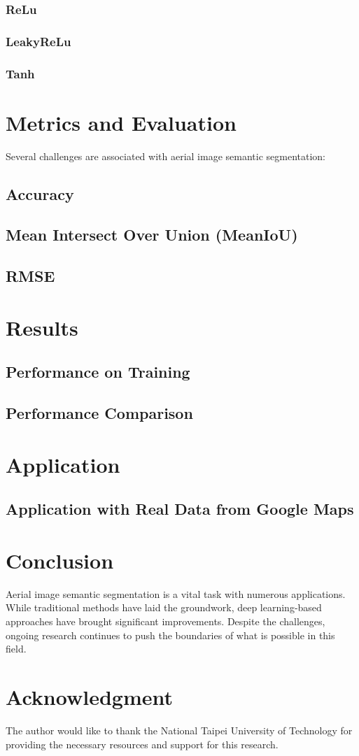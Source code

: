 \documentclass[conference]{IEEEtran}
\begin{document}
\subsubsection{ReLu}
\subsubsection{LeakyReLu}
\subsubsection{Tanh}



\section{Metrics and Evaluation}
Several challenges are associated with aerial image semantic segmentation:
\subsection{Accuracy}
\subsection{Mean Intersect Over Union (MeanIoU)}
\subsection{RMSE}

\section{Results}
\subsection{Performance on Training}
\subsection{Performance Comparison}

\section{Application}
\subsection{Application with Real Data from Google Maps}

\section{Conclusion}
Aerial image semantic segmentation is a vital task with numerous applications. While traditional methods have laid the groundwork, deep learning-based approaches have brought significant improvements. Despite the challenges, ongoing research continues to push the boundaries of what is possible in this field.

\section*{Acknowledgment}
The author would like to thank the National Taipei University of Technology for providing the necessary resources and support for this research.



\end{document}
